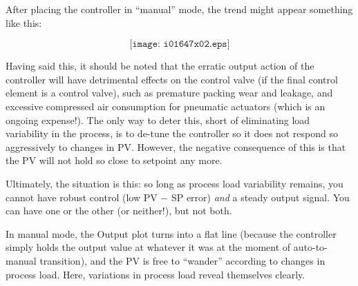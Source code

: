 After placing the controller in ``manual'' mode, the trend might appear something like this:

$$\texttt{[image: i01647x02.eps]}$$

Having said this, it should be noted that the erratic output action of the controller will have detrimental effects on the control valve (if the final control element is a control valve), such as premature packing wear and leakage, and excessive compressed air consumption for pneumatic actuators (which is an ongoing expense!).  The only way to deter this, short of eliminating load variability in the process, is to de-tune the controller so it does not respond so aggressively to changes in PV.  However, the negative consequence of this is that the PV will not hold so close to setpoint any more.
 
Ultimately, the situation is this: so long as process load variability remains, you cannot have robust control (low PV $-$ SP error) {\it and} a steady output signal.  You can have one or the other (or neither!), but not both.

In manual mode, the Output plot turns into a flat line (because the controller simply holds the output value at whatever it was at the moment of auto-to-manual transition), and the PV is free to ``wander'' according to changes in process load.  Here, variations in process load reveal themselves clearly.




